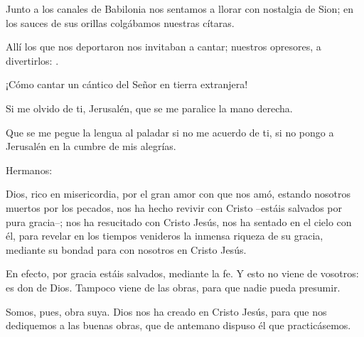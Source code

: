  


\begin{psbody}
Junto a los canales de Babilonia
nos sentamos a llorar
con nostalgia de Sion;
en los sauces de sus orillas
colgábamos nuestras cítaras. 

Allí los que nos deportaron
nos invitaban a cantar;
nuestros opresores, a divertirlos:
. 

¡Cómo cantar un cántico del Señor
en tierra extranjera!

Si me olvido de ti, Jerusalén,
que se me paralice la mano derecha. 

Que se me pegue la lengua al paladar
si no me acuerdo de ti,
si no pongo a Jerusalén
en la cumbre de mis alegrías. 
\end{psbody}


 


\begin{scripture}
Hermanos:

Dios, rico en misericordia, por el gran amor con que nos amó, estando nosotros muertos por los pecados, nos ha hecho revivir con Cristo –estáis salvados por pura gracia–; nos ha resucitado con Cristo Jesús, nos ha sentado en el cielo con él, para revelar en los tiempos venideros la inmensa riqueza de su gracia, mediante su bondad para con nosotros en Cristo Jesús.

En efecto, por gracia estáis salvados, mediante la fe. Y esto no viene de vosotros: es don de Dios. Tampoco viene de las obras, para que nadie pueda presumir.

Somos, pues, obra suya. Dios nos ha creado en Cristo Jesús, para que nos dediquemos a las buenas obras, que de antemano dispuso él que practicásemos.
\end{scripture}


 


